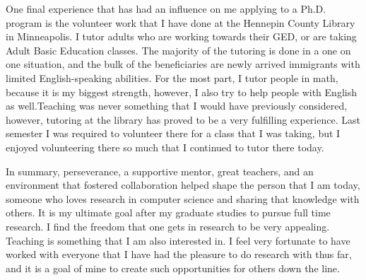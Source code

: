 \documentclass[a4paper,12pt]{article}
\begin{document}
One final experience that has had an influence on me applying to a Ph.D. program is the volunteer work that I have done at the Hennepin County Library in Minneapolis. I tutor adults who are working towards their GED, or are taking Adult Basic Education classes.  The majority of the tutoring is done in a one on one situation, and the bulk of the beneficiaries are newly arrived immigrants with limited English-speaking abilities.  For the most part, I tutor people in math, because it is my biggest strength, however, I also try to help people with English as well.Teaching was never something that I would have previously considered, however, tutoring at the library has proved to be a very fulfilling experience.  Last semester I was required to volunteer there for a class that I was taking, but I enjoyed volunteering there so much that I continued to tutor there today. 

In summary, perseverance, a supportive mentor, great teachers, and an environment that fostered collaboration helped shape the person that I am today, someone who loves research in computer science and sharing that knowledge with others.  It is my ultimate goal after my graduate studies to pursue full time research. I find the freedom that one gets in research to be very appealing.  Teaching is something that I am also interested in. I feel very fortunate to have worked with everyone that I have had the pleasure to do research with thus far, and it is a goal of mine to create such opportunities for others down the line.
\end{document}
